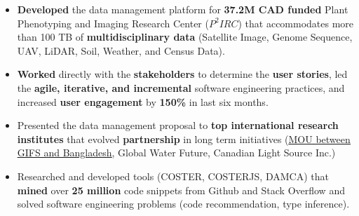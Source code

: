 \documentclass[10pt,a4paper,ragged2e,withhyper]{altacv}
\begin{document}


\makecvheader




\begin{paracol}{2}

\begin{itemize}

\item \textbf{Developed} the data management platform for \textbf{37.2M CAD funded} Plant Phenotyping and Imaging Research Center ($P^{2}IRC$) that accommodates more than 100 TB of \textbf{multidisciplinary data} (Satellite Image, Genome Sequence, UAV, LiDAR, Soil, Weather, and Census Data).

\item \textbf{Worked} directly with the \textbf{stakeholders} to determine the \textbf{user stories}, led the \textbf{agile, iterative, and incremental} software engineering practices, and increased \textbf{user engagement} by \textbf{150\%} in last six months.

\item Presented the data management proposal to\textbf{ top international research institutes} that evolved \textbf{partnership} in long term initiatives (\href{https://news.usask.ca/media-release-pages/2020/usask-global-institute-for-food-security-partners-with-bangladesh-to-promote-sustainable-food-security.php}{\underline{MOU between} \underline{GIFS and Bangladesh}}, Global Water Future, Canadian Light Source Inc.)  


\end{itemize}

\divider

\begin{itemize}

\item Researched and developed tools (COSTER, COSTERJS, DAMCA) that \textbf{mined} over \textbf{25 million} code snippets from Github and Stack Overflow and solved software engineering problems (code recommendation, type inference).


\end{itemize}
\end{paracol}
\end{document}
